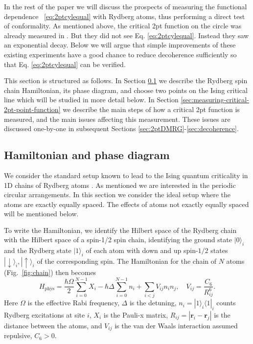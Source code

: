 \documentclass[a4paper,12pt]{article}
\theoremstyle{remark}
\theoremstyle{theorem}
\begin{document}
In the rest of the paper we will discuss the prospects of measuring the
functional dependence ~\eqref{eq:2ptcylequal} with Rydberg atoms, thus
performing a direct test of conformality. As mentioned above, the critical 2pt
function on the circle was already measured in
{\cite{Fang:2024uyf,Emperauger:2025raf}}. But they did not see Eq.
\eqref{eq:2ptcylequal}. Instead they saw an exponential decay. Below we will
argue that simple improvements of these existing experiments have a good
chance to reduce decoherence sufficiently so that Eq. \eqref{eq:2ptcylequal}
can be verified.

This section is structured as follows. In Section \ref{sec:hamiltonian-and-phase-diagram} we describe the Rydberg spin chain Hamiltonian, its phase diagram, and choose two points on the Ising critical line which will be studied in more detail below. In Section \ref{sec:measuring-critical-2pt-point-function} we describe the main steps of how a critical 2pt function is measured, and the main issues affecting this measurement. These issues are discussed one-by-one in subsequent Sections \ref{sec:2ptDMRG}-\ref{sec:decoherence}. 

\subsection{Hamiltonian and phase diagram}\label{sec:hamiltonian-and-phase-diagram}

We consider the standard setup known to lead to the Ising quantum criticality in
1D chains of Rydberg atoms {\cite[Eq.~(1)]{Browaeys:2020kzz}}. As mentioned we
are interested in the periodic circular arrangements. In this section we
consider the ideal setup where the atoms are exactly equally spaced. The
effects of atoms not exactly equally spaced will be mentioned below.

To write the Hamiltonian, we identify the Hilbert space of the Rydberg chain
with the Hilbert space of a spin-1/2 spin chain, identifying the ground state
$|0\rangle_i$ and the Rydberg state $|1\rangle_i$ of each atom with down and
up spin-$1 / 2$ states $|\!\!\downarrow\rangle_i, |\!\!\uparrow\rangle_i$ of the
corresponding spin. The Hamiltonian for the chain of $N$ atoms (Fig.~\ref{fig:chain}) then becomes
\begin{equation}
	H_{\text{phys}} = \frac{\hbar \Omega}{2}  \sum_{i = 0}^{N - 1} X_i -
	\hbar \Delta \sum_{i = 0}^{N - 1} n_i + \sum_{i < j} V_{ij} n_i n_j, \quad
	V_{ij} = \frac{C_6}{R_{ij}^6} . \label{eq:model}
\end{equation}
Here $\Omega$ is the effective Rabi frequency, $\Delta$ is the detuning, $n_i
= |1\rangle_i \langle 1|_i$ counts Rydberg excitations at site $i$, $X_i$ is
the Pauli-x matrix, $R_{ij} = | \mathbf{r}_i - \mathbf{r}_j |$ is the distance
between the atoms, and $V_{ij}$ is the van der Waals interaction assumed
repulsive, $C_6 > 0$.
\end{document}
